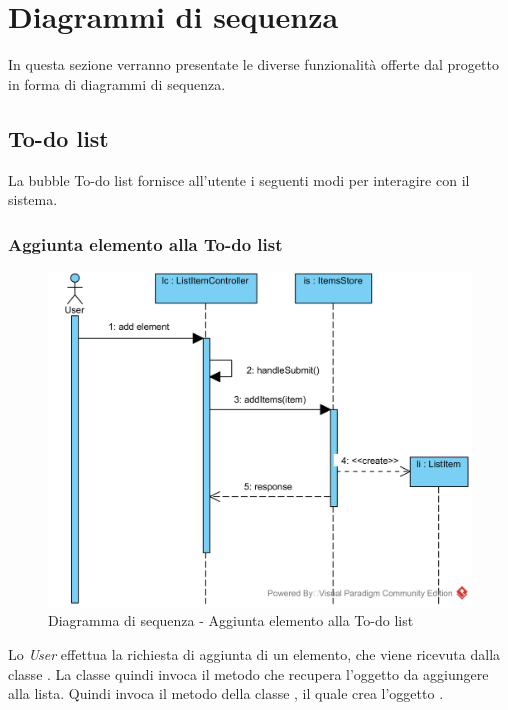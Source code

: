 \section{Diagrammi di sequenza}\label{DiagrammiDiSequenza}
In questa sezione verranno presentate le diverse funzionalità offerte dal progetto in forma di diagrammi di sequenza.

\subsection{To-do list}
La bubble To-do list fornisce all'utente i seguenti modi per interagire con il sistema.

\subsubsection{Aggiunta elemento alla To-do list}
\begin{figure}[H]
	\centering
	\includegraphics[width=15cm]{./diagrammi/sequenza/aggiunta_elemento_todo.png}
	\caption{Diagramma di sequenza - Aggiunta elemento alla To-do list}
\end{figure}
Lo \textit{User} effettua la richiesta di aggiunta di un elemento, che viene ricevuta dalla classe . La classe quindi invoca il metodo  che recupera l'oggetto da aggiungere alla lista. Quindi invoca il metodo  della classe , il quale crea l'oggetto .

